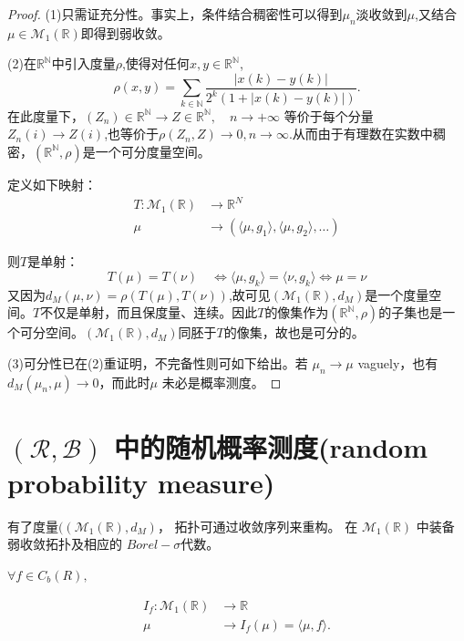 \begin{proof}
   (1)只需证充分性。事实上，条件结合稠密性可以得到$\mu_n$淡收敛到$\mu$,又结合$\mu\in\mathcal{M}_1(\mathbb{R})$即得到弱收敛。


   (2)在$\mathbb{R}^\mathbb{N}$中引入度量$\rho$,使得对任何$x,y\in\mathbb{R}^\mathbb{N}$,
   \[ \rho(x,y) = \sum_{k\in\mathbb{N}} \frac{|x(k)-y(k)|}{2^k (1+|x(k)-y(k)|)}.\]
    在此度量下，$(Z_n)\in \mathbb{R}^\mathbb{N}\rightarrow Z\in \mathbb{R}^\mathbb{N},\quad  n\to +\infty$
等价于每个分量$Z_n(i)\to Z(i)$,也等价于$\rho(Z_n,Z)\to 0,n\to\infty$.从而由于有理数在实数中稠密，$(\mathbb{R}^\mathbb{N},\rho)$是一个可分度量空间。

定义如下映射：
\begin{equation*}
    \begin{aligned}
        T:\mathcal{M}_1(\mathbb{R})&\rightarrow \mathbb{R}^N\\
        \mu \quad &\rightarrow (\langle \mu,g_1\rangle,\langle \mu,g_2\rangle,\ldots)
    \end{aligned}
\end{equation*}


则$T$是单射：
\[  T(\mu) = T(\nu) \quad \iff \langle \mu,g_k\rangle = \langle \nu,g_k\rangle\iff \mu=\nu \]
又因为$d_M(\mu,\nu)=\rho(T(\mu),T(\nu))$,故可见$(\mathcal{M}_1(\mathbb{R}),d_M)$是一个度量空间。$T$不仅是单射，而且保度量、连续。因此$T$的像集作为$(\mathbb{R}^\mathbb{N},\rho)$的子集也是一个可分空间。$(\mathcal{M}_1(\mathbb{R}),d_M)$同胚于$T$的像集，故也是可分的。

   (3)可分性已在(2)重证明，不完备性则可如下给出。若 $\mu_n \to \mu$ vaguely，也有 $d_M(\mu_n, \mu) \to 0$，而此时$\mu$ 未必是概率测度。
\end{proof}


\section{$(\mathcal{R}, \mathcal{B})$ 中的随机概率测度(random probability measure)}

有了度量$((\mathcal{M}_1(\mathbb{R}), d_M) $， 拓扑可通过收敛序列来重构。
在 $\mathcal{M}_1(\mathbb{R})$ 中装备弱收敛拓扑及相应的 $Borel-\sigma$代数。

$\forall f \in C_b(R),$

\begin{equation*}
    \begin{aligned}
        I_f: \mathcal{M}_1(\mathbb{R}) &\to \mathbb{R}\\
        \mu&\to I_f(\mu)=\langle\mu,f\rangle.
    \end{aligned}
\end{equation*}


